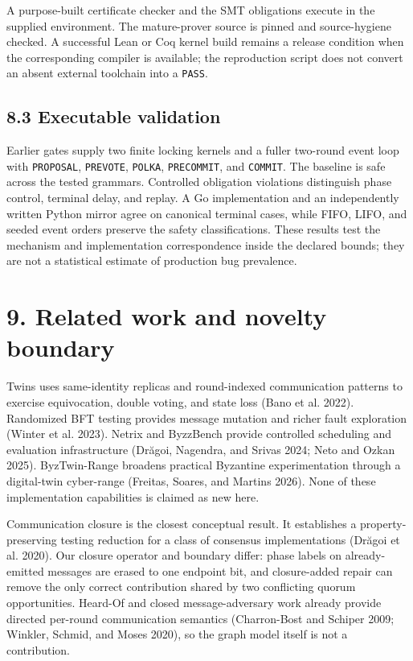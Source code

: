 \documentclass[10pt,a4paper]{article}
\begin{document}
A purpose-built certificate checker and the SMT obligations execute in
the supplied environment. The mature-prover source is pinned and
source-hygiene checked. A successful Lean or Coq kernel build remains a
release condition when the corresponding compiler is available; the
reproduction script does not convert an absent external toolchain into a
\texttt{PASS}.

\subsection{8.3 Executable validation}\label{executable-validation}

Earlier gates supply two finite locking kernels and a fuller two-round
event loop with \texttt{PROPOSAL}, \texttt{PREVOTE}, \texttt{POLKA},
\texttt{PRECOMMIT}, and \texttt{COMMIT}. The baseline is safe across the
tested grammars. Controlled obligation violations distinguish phase
control, terminal delay, and replay. A Go implementation and an
independently written Python mirror agree on canonical terminal cases,
while FIFO, LIFO, and seeded event orders preserve the safety
classifications. These results test the mechanism and implementation
correspondence inside the declared bounds; they are not a statistical
estimate of production bug prevalence.

\section{9. Related work and novelty
boundary}\label{related-work-and-novelty-boundary}

Twins uses same-identity replicas and round-indexed communication
patterns to exercise equivocation, double voting, and state loss (Bano
et al. 2022). Randomized BFT testing provides message mutation and
richer fault exploration (Winter et al. 2023). Netrix and ByzzBench
provide controlled scheduling and evaluation infrastructure (Drăgoi,
Nagendra, and Srivas 2024; Neto and Ozkan 2025). ByzTwin-Range broadens
practical Byzantine experimentation through a digital-twin cyber-range
(Freitas, Soares, and Martins 2026). None of these implementation
capabilities is claimed as new here.

Communication closure is the closest conceptual result. It establishes a
property-preserving testing reduction for a class of consensus
implementations (Drăgoi et al. 2020). Our closure operator and boundary
differ: phase labels on already-emitted messages are erased to one
endpoint bit, and closure-added repair can remove the only correct
contribution shared by two conflicting quorum opportunities. Heard-Of
and closed message-adversary work already provide directed per-round
communication semantics (Charron-Bost and Schiper 2009; Winkler, Schmid,
and Moses 2020), so the graph model itself is not a contribution.
\end{document}
